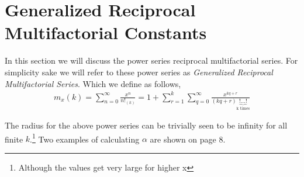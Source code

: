 \documentclass[12pt]{article}
\numberwithin{equation}{section}
\begin{document}
\section{Generalized Reciprocal Multifactorial Constants}
In this section we will discuss the power series reciprocal multifactorial series. For simplicity sake we will refer to these power series as \emph{Generalized Reciprocal Multifactorial Series}.
Which we define as follows,
\begin{align}
    m_x(k)=\sum_{n=0}^\infty \frac{x^n}{n!_{(k)}}=1+\sum_{r=1}^{k}\sum_{q=0}^{\infty}\frac{x^{kq+r}}{(kq+r)\underbrace{!\dots!}_{\text{k times}}}
\end{align}
\par The radius for the above power series can be trivially seen to be infinity for all finite $k$.\footnote{Although the values get very large for higher x} Two examples of calculating $\alpha$ are shown on page 8. 
\end{document}
